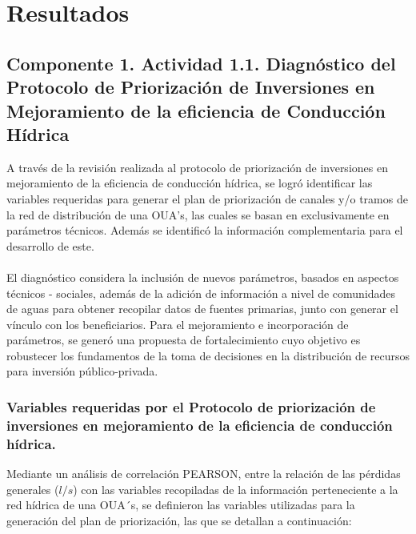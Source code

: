 \documentclass[]{article}
\begin{document}
\section{Resultados}

\subsection{Componente 1. Actividad 1.1. Diagnóstico del Protocolo de Priorización de Inversiones en Mejoramiento de la eficiencia de Conducción Hídrica}

A través de la revisión realizada al protocolo de priorización de inversiones en mejoramiento de la eficiencia de conducción hídrica, se logró identificar las variables requeridas para generar el plan de priorización de canales y/o tramos de la red de distribución de una OUA's, las cuales se basan en exclusivamente en parámetros técnicos. Además se identificó la información complementaria para el desarrollo de este.\\
\\
El diagnóstico considera la inclusión de nuevos parámetros, basados en aspectos técnicos - sociales, además de la adición de información a nivel de comunidades de aguas para obtener recopilar datos de fuentes primarias, junto con generar el vínculo con los beneficiarios. Para el mejoramiento e incorporación de parámetros, se generó una propuesta de fortalecimiento cuyo objetivo es robustecer los fundamentos de la toma de decisiones en la distribución de recursos para inversión público-privada.

\subsubsection{Variables requeridas por el Protocolo de priorización de inversiones en mejoramiento de la eficiencia de conducción hídrica.}

Mediante un análisis de correlación PEARSON, entre la relación de las pérdidas generales ($l/s$) con las variables recopiladas de la información perteneciente a la red hídrica de una OUA´s, se definieron las variables utilizadas para la generación del plan de priorización, las que se detallan a continuación:
\end{document}
